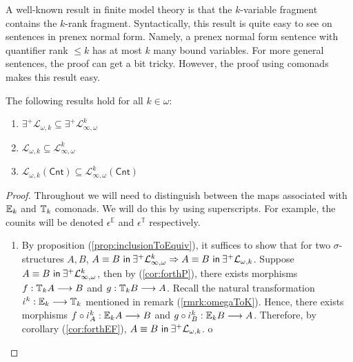 A well-known result in finite model theory is that the $k$-variable fragment contains the $k$-rank fragment. Syntactically, this result is quite easy to see on sentences in prenex normal form. Namely, a prenex normal form sentence with quantifier rank $\leq k$ has at most $k$ many bound variables. For more general sentences, the proof can get a bit tricky. However, the proof using comonads makes this result easy. 
\begin{prop} The following results hold for all $k \in \omega$:
\begin{enumerate}[label=(\arabic*)]
\item $\exists^{+}\mathcal{L}_{\omega,k} \subseteq \exists^{+}\mathcal{L}^{k}_{\infty,\omega}$
\item $\mathcal{L}_{\omega,k} \subseteq \mathcal{L}^{k}_{\infty,\omega}$
\item $\mathcal{L}_{\omega,k}(\mathsf{Cnt}) \subseteq \mathcal{L}^{k}_{\infty,\omega}(\mathsf{Cnt})$
\end{enumerate}
\begin{proof}
Throughout we will need to distinguish between the maps associated with ${\mathbb{E}_{k}}$ and ${\mathbb{T}_{k}}$ comonads. We will do this by using superscripts. For example, the counits will be denoted $\epsilon^{\mathbb{E}}$ and $\epsilon^{\mathbb{T}}$ respectively.  
\begin{enumerate}[label=(\arabic*)]
\item By proposition (\ref{prop:inclusionToEquiv}), it suffices to show that for two $\sigma$-structures $A,B$, ${A \equiv B \ \mathsf{in}\: \exists^{+}\mathcal{L}^{k}_{\infty,\omega}} \Rightarrow {A \equiv B \ \mathsf{in}\: \exists^{+}\mathcal{L}_{\omega,k}}$. Suppose ${A \equiv B \ \mathsf{in}\: \exists^{+}\mathcal{L}^{k}_{\infty,\omega}} $, then by (\ref{cor:forthP}), there exists morphisms $f:{\mathbb{T}_{k}A} \longrightarrow B$ and $g:{\mathbb{T}_{k}B} \longrightarrow A$. Recall the natural transformation $\iota^{k}:\efcomonad{k}{} \longrightarrow \pcomonad{k}{}$ mentioned in remark (\ref{rmrk:omegaToK}). Hence, there exists morphisms $f \circ \iota^{k}_{A}:\efcomonad{k}{A} \longrightarrow B$ and $g \circ \iota^{k}_{B}:\efcomonad{k}{B} \longrightarrow A$. Therefore, by corollary (\ref{cor:forthEF}), ${A \equiv B \ \mathsf{in}\: \exists^{+}\mathcal{L}_{\omega,k}}$.
o

\end{enumerate}
\end{proof}
\end{prop}
